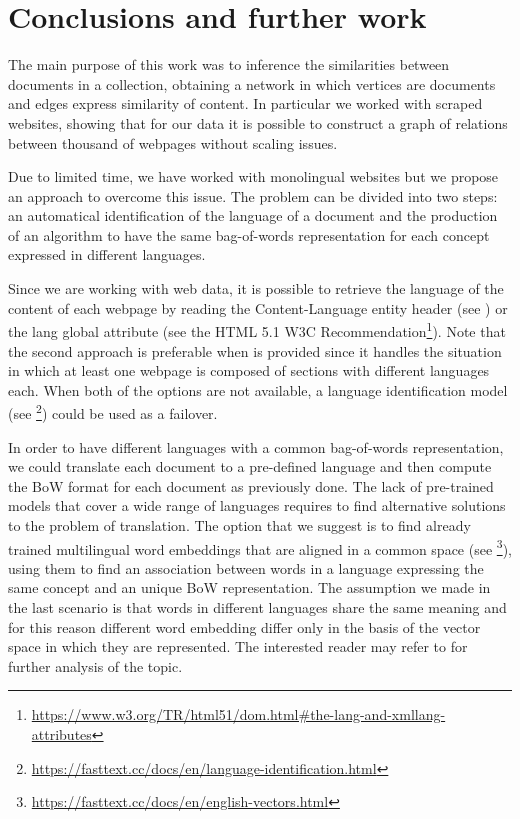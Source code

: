 \chapter{Conclusions and further work}
The main purpose of this work was to inference
the similarities between documents in a collection,
obtaining a network in which vertices are documents and
edges express similarity of content.
In particular we worked with scraped websites,
showing that for our data it is possible to construct
a graph of relations between thousand of webpages
without scaling issues.

Due to limited time, we have worked with monolingual
websites but we propose an approach to overcome this issue.
The problem can be divided into two steps:
an automatical identification of the language of a document and
the production of an algorithm to have the same bag-of-words
representation for each concept expressed in different languages.

Since we are working with web data, it is possible to retrieve the language
of the content of each webpage by reading the Content-Language entity header
(see \cite{rfc7231}) or the lang global attribute
(see the HTML 5.1 W3C Recommendation\footnote{\url{https://www.w3.org/TR/html51/dom.html\#the-lang-and-xmllang-attributes}}).
Note that the second approach is preferable when  is provided
since it handles the situation in which at least
one webpage is composed of sections with different languages each.
When both of the options are not available,
a language identification model
(see \footnote{\url{https://fasttext.cc/docs/en/language-identification.html}})
could be used as a failover.

In order to have different languages with a common bag-of-words
representation, we could translate each document to a pre-defined language
and then compute the BoW format for each document as previously done.
The lack of pre-trained models that cover a wide range of languages
requires to find alternative solutions to the problem of translation.
The option that we suggest is to find already trained multilingual word embeddings
that are aligned in a common space (see \footnote{\url{https://fasttext.cc/docs/en/english-vectors.html}}),
using them to find an association between words in a language expressing the same concept and an unique BoW representation.
The assumption we made in the last scenario is that words in different languages share
the same meaning and for this reason different word embedding differ only in the basis
of the vector space in which they are represented.
The interested reader may refer to \cite{DBLP:journals/corr/abs-1804-07745} for further analysis of the topic.